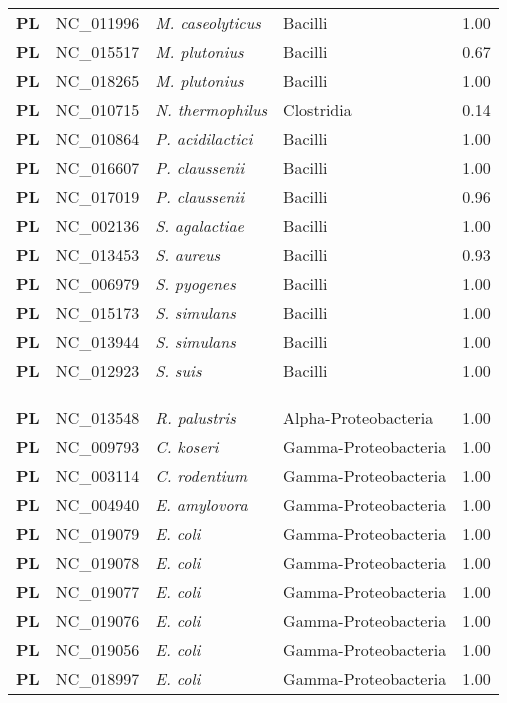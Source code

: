 \begin{adjustwidth}{-3cm}{2cm}
{\begin{supertabular}{>{\bfseries}l|p{0.1\textwidth}p{0.14\textwidth}l|l}
PL & NC\_011996 & \textit{M. caseolyticus} & Bacilli & 1.00\\
PL & NC\_015517 & \textit{M. plutonius} & Bacilli & 0.67\\
PL & NC\_018265 & \textit{M. plutonius} & Bacilli & 1.00\\
PL & NC\_010715 & \textit{N. thermophilus} & Clostridia & 0.14\\
PL & NC\_010864 & \textit{P. acidilactici} & Bacilli & 1.00\\
PL & NC\_016607 & \textit{P. claussenii} & Bacilli & 1.00\\
PL & NC\_017019 & \textit{P. claussenii} & Bacilli & 0.96\\
PL & NC\_002136 & \textit{S. agalactiae} & Bacilli & 1.00\\
PL & NC\_013453 & \textit{S. aureus} & Bacilli & 0.93\\
PL & NC\_006979 & \textit{S. pyogenes} & Bacilli & 1.00\\
PL & NC\_015173 & \textit{S. simulans} & Bacilli & 1.00\\
PL & NC\_013944 & \textit{S. simulans} & Bacilli & 1.00\\
PL & NC\_012923 & \textit{S. suis} & Bacilli & 1.00\\
\\
\\
\hline\\
PL & NC\_013548 & \textit{R. palustris} & Alpha-Proteobacteria & 1.00\\
PL & NC\_009793 & \textit{C. koseri} & Gamma-Proteobacteria & 1.00\\
PL & NC\_003114 & \textit{C. rodentium} & Gamma-Proteobacteria & 1.00\\
PL & NC\_004940 & \textit{E. amylovora} & Gamma-Proteobacteria & 1.00\\
PL & NC\_019079 & \textit{E. coli} & Gamma-Proteobacteria & 1.00\\
PL & NC\_019078 & \textit{E. coli} & Gamma-Proteobacteria & 1.00\\
PL & NC\_019077 & \textit{E. coli} & Gamma-Proteobacteria & 1.00\\
PL & NC\_019076 & \textit{E. coli} & Gamma-Proteobacteria & 1.00\\
PL & NC\_019056 & \textit{E. coli} & Gamma-Proteobacteria & 1.00\\
PL & NC\_018997 & \textit{E. coli} & Gamma-Proteobacteria & 1.00\\

\end{supertabular}}
\end{adjustwidth}
